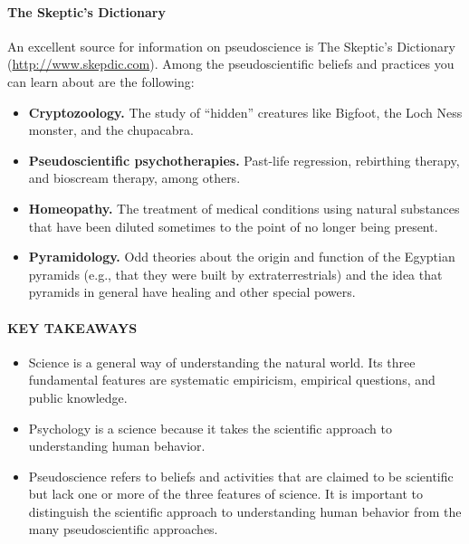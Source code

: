 \documentclass[
]{krantz}
\providecommand{\tightlist}{%
  \setlength{\itemsep}{0pt}\setlength{\parskip}{0pt}}
\begin{document}
\paragraph*{The Skeptic's Dictionary}\label{the-skeptics-dictionary}

An excellent source for information on pseudoscience is The Skeptic's Dictionary (\url{http://www.skepdic.com}). Among the pseudoscientific beliefs and practices you can learn about are the following:

\begin{itemize}
\tightlist
\item
  \textbf{Cryptozoology.} The study of ``hidden'' creatures like Bigfoot, the Loch Ness monster, and the chupacabra.
\item
  \textbf{Pseudoscientific psychotherapies.} Past-life regression, rebirthing therapy, and bioscream therapy, among others.
\item
  \textbf{Homeopathy.} The treatment of medical conditions using natural substances that have been diluted sometimes to the point of no longer being present.
\item
  \textbf{Pyramidology.} Odd theories about the origin and function of the Egyptian pyramids (e.g., that they were built by extraterrestrials) and the idea that pyramids in general have healing and other special powers.
\end{itemize}

\paragraph*{KEY TAKEAWAYS}\label{key-takeaways}

\begin{itemize}
\item
  Science is a general way of understanding the natural world. Its three fundamental features are systematic empiricism, empirical questions, and public knowledge.
\item
  Psychology is a science because it takes the scientific approach to understanding human behavior.
\item
  Pseudoscience refers to beliefs and activities that are claimed to be scientific but lack one or more of the three features of science. It is important to distinguish the scientific approach to understanding human behavior from the many pseudoscientific approaches.
\end{itemize}
\end{document}
